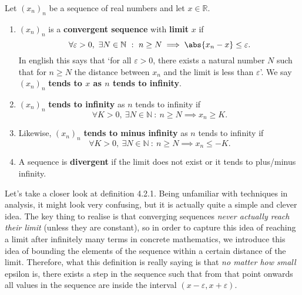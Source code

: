 \documentclass[../real_analysis.tex]{subfiles}
\begin{document}
        \begin{definition}
            Let $(x_n)_n$ be a sequence of real numbers and let $x\in\mathbb{R}$.
            \begin{enumerate}
                \item $(x_n)_n$ is a \textbf{convergent sequence} with \textbf{limit} $x$ if
                \begin{equation}
                    \forall\varepsilon>0,\ \exists N\in\mathbb{N}\ :\ n\geq N\implies\abs{x_n-x}\leq\varepsilon.
                \end{equation}
                In english this says that `for all $\varepsilon>0$, there exists a natural number $N$ such that for $n\geq N$ the distance between $x_n$ and the limit is less than $\varepsilon$'. We say $(x_n)_n$ \textbf{tends to $x$ as $n$ tends to infinity}.
                \item $(x_n)_n$ \textbf{tends to infinity} as $n$ tends to infinity if
                \begin{equation}
                    \forall K>0,\ \exists N\in\mathbb{N}\ :\ n\geq N\implies x_n\geq K.
                \end{equation}
                \item Likewise, $(x_n)_n$ \textbf{tends to minus infinity} as $n$ tends to infinity if
                \begin{equation}
                    \forall K>0,\ \exists N\in\mathbb{N}\ :\ n\geq N\implies x_n\leq -K.
                \end{equation}
                \item A sequence is \textbf{divergent} if the limit does not exist or it tends to plus/minus infinity.
            \end{enumerate}
        \end{definition}
        Let's take a closer look at definition 4.2.1. Being unfamiliar with techniques in analysis, it might look very confusing, but it is actually quite a simple and clever idea. The key thing to realise is that converging sequences \textit{never actually reach their limit} (unless they are constant), so in order to capture this idea of reaching a limit after infinitely many terms in concrete mathematics, we introduce this idea of bounding the elements of the sequence within a certain distance of the limit. Therefore, what this definition is really saying is that \textit{no matter how small} epsilon is, there exists a step in the sequence such that from that point onwards all values in the sequence are inside the interval $(x-\varepsilon,x+\varepsilon)$.
\end{document}
